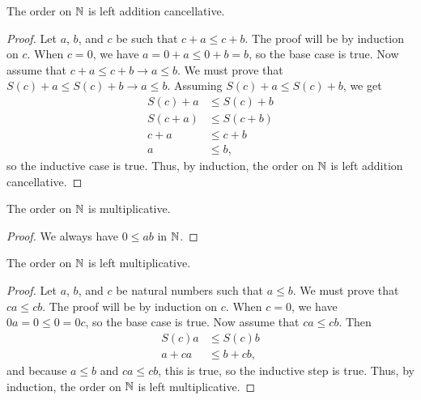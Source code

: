 \documentclass[../../math.tex]{subfiles}
\begin{document}
\begin{instance}
    The order on $\mathbb{N}$ is left addition cancellative.
\end{instance}
\begin{proof}
    Let $a$, $b$, and $c$ be such that $c + a \leq c + b$.  The proof will be by
    induction on $c$.  When $c = 0$, we have $a = 0 + a \leq 0 + b = b$, so the
    base case is true.  Now assume that $c + a \leq c + b \rightarrow a \leq b$.
    We must prove that $S(c) + a \leq S(c) + b \rightarrow a \leq b$.  Assuming
    $S(c) + a \leq S(c) + b$, we get
    \begin{align*}
        S(c) + a &\leq S(c) + b \\
        S(c + a) &\leq S(c + b) \\
        c + a &\leq c + b \\
        a &\leq b,
    \end{align*}
    so the inductive case is true.  Thus, by induction, the order on $\mathbb{N}$ is
    left addition cancellative.
\end{proof}

\begin{instance}
    The order on $\mathbb{N}$ is multiplicative.
\end{instance}
\begin{proof}
    We always have $0 \leq ab$ in $\mathbb{N}$.
\end{proof}

\begin{instance}
    The order on $\mathbb{N}$ is left multiplicative.
\end{instance}
\begin{proof}
    Let $a$, $b$, and $c$ be natural numbers such that $a \leq b$.  We must
    prove that $ca \leq cb$.  The proof will be by induction on $c$.  When
    $c = 0$, we have $0a = 0 \leq 0 = 0c$, so the base case is true.  Now
    assume that $ca \leq cb$.  Then
    \begin{align*}
        S(c)a &\leq S(c)b \\
        a + ca &\leq b + cb,
    \end{align*}
    and because $a \leq b$ and $ca \leq cb$, this is true, so the inductive step
    is true.  Thus, by induction, the order on $\mathbb{N}$ is left multiplicative.
\end{proof}
\end{document}
